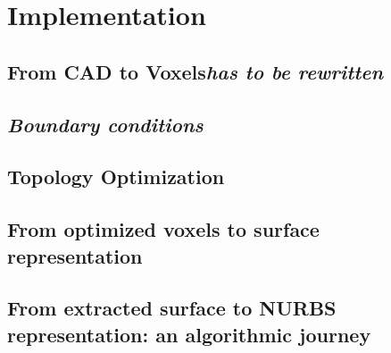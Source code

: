 %
\chapter{Implementation}
\label{chapter:software}

\section{From CAD to Voxels{\it has to be rewritten}}
\label{sec: CADToVoxels}


\section{\it Boundary conditions}

\section{Topology Optimization}


\section{From optimized voxels to surface representation}


\section{From extracted surface to NURBS representation: an algorithmic journey}



